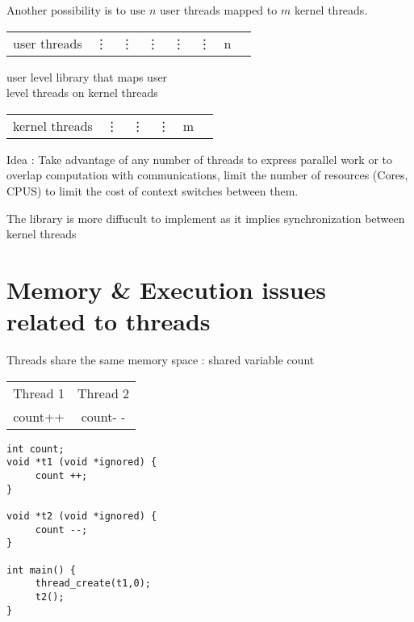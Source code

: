 \documentclass[a4paper,10pt]{article}
\begin{document}
Another possibility is to use $n$ user threads mapped to $m$ kernel threads.

\begin{tabular}{cccccccc}
	user threads & \vdots & \vdots & \vdots & \vdots & \vdots & n
\end{tabular}

\begin{flushright}
	user level library that maps user
	\\
	level threads on kernel threads
\end{flushright}

\begin{tabular}{cccccc}
	kernel threads & \vdots & \vdots & \vdots & m
\end{tabular}



Idea : Take advantage of any number of threads to express parallel work or to overlap computation with communications, limit the number of resources (Cores, CPUS) to limit the cost of context switches between them.

The library is more diffucult to implement as it implies synchronization between kernel threads

\section{Memory \& Execution issues related to threads}

Threads share the same memory space :
\center shared variable
\center count

\begin{tabular}{c|c}
\hline
	Thread 1 & Thread 2\\

	count++ & count- -\\
\hline
\end{tabular}

\begin{verbatim}
int count;
void *t1 (void *ignored) {
     count ++;
}

void *t2 (void *ignored) {
     count --;
}

int main() {
     thread_create(t1,0);
     t2();
}
	
\end{verbatim}


 
\end{document}
